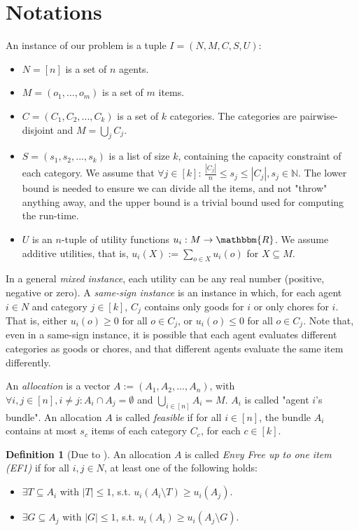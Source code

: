 \documentclass[sigconf]{aamas}
\theoremstyle{definition}
\newtheorem{definition}[theorem]{Definition}
\begin{document}
\section{Notations}
An instance of our problem is a tuple $I = (N, M, C, S, U)$:
\begin{itemize}
    \item $N = [n]$ is a set of $n$ agents.
    \item $M = (o_1,\ldots,o_m)$ is a set of $m$ items.
    \item $C = (C_1, C_2, ..., C_k)$ is a set of $k$ categories. The categories are pairwise-disjoint and $M = \bigcup _{j} C_j$.
    \item $S = (s_1, s_2, ..., s_k)$ is a list of size $k$, containing the capacity constraint of each category. We assume that $\forall j \in [k]$: $\frac{|C_j|}{n} \leq s_j \leq |C_j|, s_j\in \mathds{N}$.
    The lower bound is needed to ensure we can divide all the items, and not "throw" anything away, and the upper bound is a trivial bound used for computing the run-time.
    \item
    $U$ is an $n$-tuple of utility functions $u_i : M \rightarrow \mathbbm{R}$. We assume additive utilities, that is, $u_i(X) := \sum _{o \in X} u_i(o)$ for $X \subseteq M$.
\end{itemize}  

In a general \emph{mixed instance}, each utility can be any real number (positive, negative or zero).
A \emph{same-sign instance} is an instance in which, for each agent $i\in N$ and category  $j \in [k]$,
$C_j$ contains only goods for $i$ or only chores for $i$. That is, 
either $u_i(o)\geq 0$ for all $o\in C_j$, or 
$u_i(o)\leq 0$ for all $o\in C_j$.
Note that, even in a same-sign instance, it is possible that each agent evaluates different categories as goods or chores, and that different agents evaluate the same item differently.

An \emph{allocation} is a vector $A := (A_1, A_2, ..., A_n)$, 
with $\forall i,j \in [n], i \neq j : A_i \cap A_j = \emptyset$ and $\bigcup _{i \in [n]} A_i = M$.
$A_i$ is called "agent $i$'s bundle". 
An allocation $A$ is called \emph{feasible} if for all $i\in[n]$,
the bundle $A_i$ contains at most $s_c$ items of each category $C_c$, for each $c\in [k]$.

\begin{definition}[Due to \citet{aziz2022fair}]
\label{def:ef1}
An allocation $A$ is called \textit{Envy Free up to one item (EF1)} if for all $i,j\in N$, at least one of the following holds:
\begin{itemize}
\item $\exists T\subseteq A_i$ with $|T|\leq 1$,
s.t. $u_i(A_i\setminus T) \geq u_i(A_j)$.
\item $\exists G\subseteq A_j$ with $|G|\leq 1$,
s.t. $u_i(A_i) \geq u_i(A_j\setminus G)$.
\end{itemize}
\end{definition}
\end{document}
